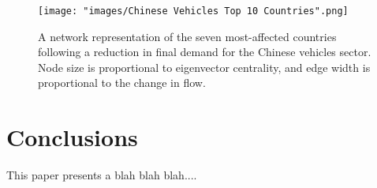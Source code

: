 \documentclass[a4paper]{article}
\begin{document}
\begin{figure}
\centering
\texttt{[image: "images/Chinese Vehicles Top 10 Countries".png]}
\caption{A network representation of the seven most-affected countries following a reduction in final demand for the Chinese vehicles sector. Node size is proportional to eigenvector centrality, and edge width is proportional to the change in flow.}\label{fig:chnvehtop6}
\end{figure}


\section{Conclusions}\label{sec:conclusions}
This paper presents a blah blah blah....


\printbibliography
\end{document}
